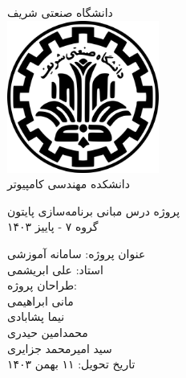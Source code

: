 \thispagestyle{empty}
\begin{center}
    {دانشگاه صنعتی شریف}\\
    \vspace{8mm}
    \includegraphics[width=5cm]{images/sharif.png}\\
    \vspace{12mm}
    {\large دانشکده مهندسی کامپیوتر}\\
    \vspace{16mm}

    {\huge پروژه درس مبانی برنامه‌سازی پایتون}\\
    \vspace{5mm}
    {\Large گروه ۷ - پاییز ۱۴۰۳}\\
    \vspace{5mm}

    {\Large عنوان پروژه: سامانه آموزشی }\\

    \vspace{12mm}
    {\Large استاد: علی ابریشمی}\\
    \vspace{20mm}
    {\large طراحان پروژه: }\\
    \vspace{4mm}
    {\large مانی ابراهیمی}\\
    {\large نیما پشابادی}\\
    {\large محمدامین حیدری}\\
    {\large سید امیرمحمد جزایری}\\

    \vspace{20mm}
    {\Large تاریخ تحویل: ۱۱ بهمن ۱۴۰۳}\\
\end{center}